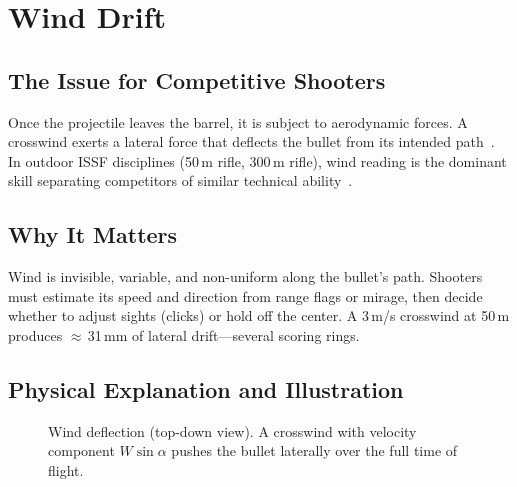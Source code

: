 \documentclass[11pt]{article}
\begin{document}
\section{Wind Drift}\label{sec:wind}

\subsection{The Issue for Competitive Shooters}
Once the projectile leaves the barrel, it is subject to aerodynamic
forces.  A crosswind exerts a lateral force that deflects the bullet
from its intended path~\cite{mccoy,litz}.  In outdoor ISSF
disciplines (50\,m rifle, 300\,m rifle), wind reading is the
dominant skill separating competitors of similar technical
ability~\cite{litz}.

\subsection{Why It Matters}
Wind is invisible, variable, and non-uniform along the bullet's
path.  Shooters must estimate its speed and direction from range flags
or mirage, then decide whether to adjust sights (clicks) or hold off
the center.  A 3\,m/s crosswind at 50\,m produces $\approx$\,31\,mm
of lateral drift---several scoring rings.

\subsection{Physical Explanation and Illustration}

\begin{figure}[H]
\centering
{}
\caption{Wind deflection (top-down view).  A crosswind with velocity
component $W\sin\alpha$ pushes the bullet laterally over the full
time of flight.}
\label{fig:wind}
\end{figure}
\end{document}
